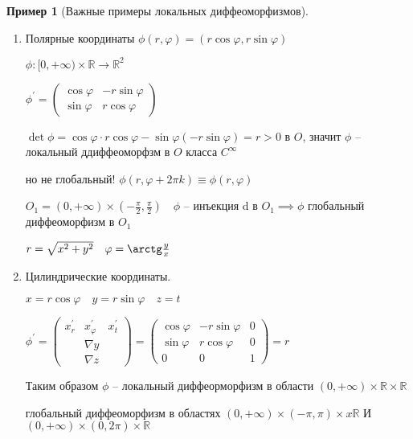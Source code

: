 \documentclass{book}
\newcommand\R{\ensuremath{\mathbb{R}}}
\newcommand{\p}[1]{#1^{\prime}}
\theoremstyle{definition}
\newtheorem*{example}{Пример}
\begin{document}
        \begin{example}
            [Важные примеры локальных диффеоморфизмов]

            \begin{enumerate}
                \item Полярные координаты $\phi(r, \varphi) = \left( r\cos \varphi, r\sin \varphi \right) $ 

                    $\phi: [0,+\infty )\times \R \to \R^2$

                    $\p \phi = \begin{pmatrix} \cos \varphi&-r\sin \varphi\\ \sin \varphi & r\cos \varphi \end{pmatrix} $ 

                    $\det \phi = \cos \varphi\cdot r\cos\varphi - \sin \varphi\left( -r\sin\varphi  \right) = r>0$ в $O$, значит  $\phi$ -- локальный ддиффеоморфзм в  $O$ класса  $C^{\infty }$

                    но не глобальный! $\phi(r, \varphi+2\pi k)\equiv \phi(r, \varphi)$

                    $O_1= \left( 0, +\infty  \right) \times \left( -\frac{\pi}{2}, \frac{\pi}{2}  \right) \quad \phi$ -- инъекция d в $O_1 \implies \phi$  глобальный диффеоморфизм в $O_1$

                    $r = \sqrt{x^2+y^2} \quad \varphi = \arctg \frac{y}{x}$
                \item Цилиндрические координаты.

                    $x = r\cos \varphi\quad y = r\sin\varphi\quad z = t$

                    $\p \phi  = \begin{pmatrix} \p x_r & \p x_{\varphi} & \p x_t\\&\nabla y&\\&\nabla z \end{pmatrix}  = \begin{pmatrix} \cos \varphi&-r\sin \varphi&0\\ \sin \varphi & r\cos \varphi &0\\0&0&1 \end{pmatrix}  = r$

                    Таким образом $\phi$ -- локальный диффеорморфизм в области $\left( 0, +\infty  \right) \times \R\times \R$

                    глобальный диффеоморфизм в областях $(0, +\infty ) \times \left( -\pi , \pi  \right) \times x\R$ И $\left( 0, +\infty  \right) \times \left( 0, 2\pi  \right) \times \R$


\end{enumerate}
\end{example}
\end{document}
